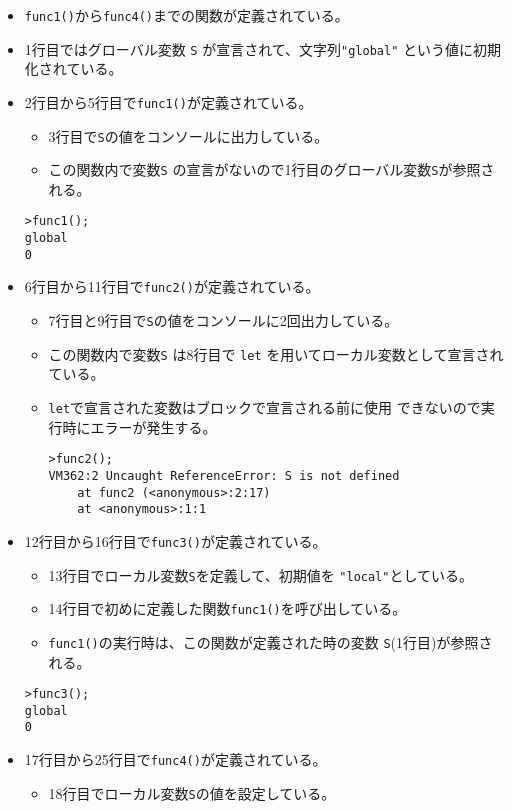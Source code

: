 \begin{itemize}
 \item \Verb+func1()+から\Verb+func4()+までの関数が定義されている。
 \item 1行目ではグローバル変数 \Verb+S+ が宣言されて、文字列\Verb+"global"+
       という値に初期化されている。
 \item 2行目から5行目で\Verb+func1()+が定義されている。
\begin{itemize}
 \item 3行目で\Verb+S+の値をコンソールに出力している。
 \item この関数内で変数\Verb+S+
       の宣言がないので1行目のグローバル変数\texttt{S}が参照される。
\end{itemize}       
\begin{Verbatim}
>func1();
global
0
\end{Verbatim}
 \item 6行目から11行目で\Verb+func2()+が定義されている。
\begin{itemize}
 \item 7行目と9行目で\Verb+S+の値をコンソールに2回出力している。
 \item この関数内で変数\Verb+S+ は8行目で
       \Verb+let+ を用いてローカル変数として宣言されている。
  \item \Verb+let+で宣言された変数はブロックで宣言される前に使用
       できないので実行時にエラーが発生する。
\begin{Verbatim}
>func2();
VM362:2 Uncaught ReferenceError: S is not defined
    at func2 (<anonymous>:2:17)
    at <anonymous>:1:1
\end{Verbatim}
\end{itemize}
 \item 12行目から16行目で\Verb+func3()+が定義されている。
\begin{itemize}
 \item 13行目でローカル変数\Verb+S+を定義して、初期値を
       \Verb+"local"+としている。
 \item 14行目で初めに定義した関数\Verb+func1()+を呼び出している。
 \item \Verb+func1()+の実行時は、この関数が定義された時の変数
       \Verb+S+(1行目)が参照される。
\end{itemize}
\begin{Verbatim}
>func3();
global
0
\end{Verbatim}
 \item 17行目から25行目で\Verb+func4()+が定義されている。
\begin{itemize}
 \item 18行目でローカル変数\Verb+S+の値を設定している。

\end{itemize}
\end{itemize}
